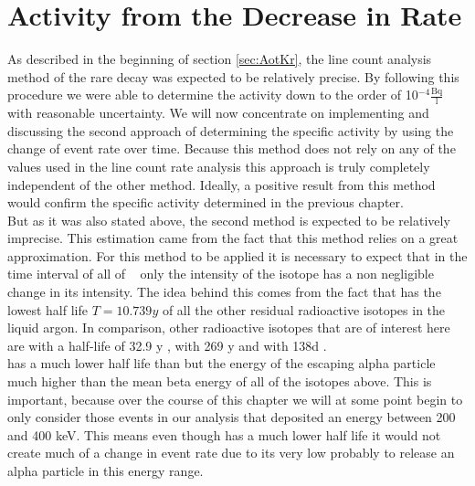 \chapter{Activity from the Decrease in Rate}
\label{sec:SAfromDecrease}

As described in the beginning of section \ref{sec:AotKr}, the line count analysis method of the rare \Kr decay was expected to be relatively precise.
By following this procedure we were able to determine the activity down to the order of 10$^{-4} \frac{\mathrm{Bq}}{\mathrm{l}}$ with reasonable uncertainty.
We will now concentrate on implementing and discussing the second approach of determining the specific activity by using the change of event rate over time.
Because this method does not rely on any of the values used in the line count rate analysis this approach is truly completely independent of the other method.
Ideally, a positive result from this method would confirm the specific activity determined in the previous chapter. 
\\

But as it was also stated above, the second method is expected to be relatively imprecise.  
This estimation came from the fact that this method relies on a great approximation.
For this method to be applied it is necessary to expect that in the time interval of all of \PII~ only the intensity of the \Kr isotope has a non negligible change in its intensity.
The idea behind this comes from the fact that \Kr has the lowest half life \(T = 10.739\unit{y}\) of all the other residual radioactive isotopes in the liquid argon.
In comparison, other radioactive isotopes that are of interest here are  with a half-life of 32.9 y \cite{chen_nuclear_2016},  with 269 y \cite{singh_nuclear_2006} and  with 138d \cite{kondev_nuclear_2008}. 
\\

 has a much lower half life than \Kr but the energy of the escaping alpha particle much higher than the mean beta energy of all of the isotopes above.
This is important, because over the course of this chapter we will at some point begin to only consider those events in our analysis that deposited an energy between 200 and 400 keV.   
This means even though  has a much lower half life it would not create much of a change in event rate due to its very low probably to release an alpha particle in this energy range.
\\


